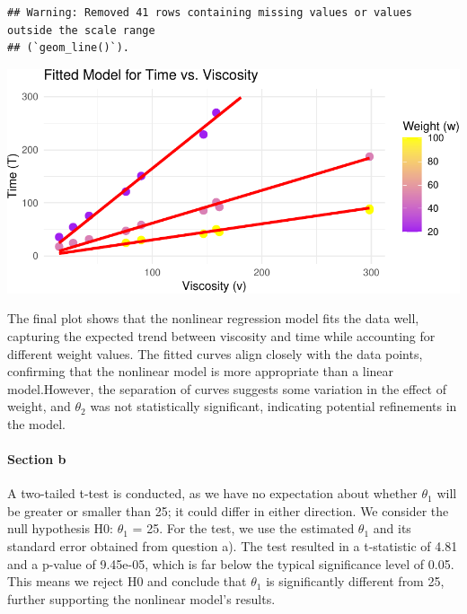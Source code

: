 \documentclass[
  11pt,
]{article}
\begin{document}
\begin{verbatim}
## Warning: Removed 41 rows containing missing values or values outside the scale range
## (`geom_line()`).
\end{verbatim}

\includegraphics{ReportAssignment2_files/figure-latex/unnamed-chunk-23-1.pdf}

The final plot shows that the nonlinear regression model fits the data
well, capturing the expected trend between viscosity and time while
accounting for different weight values. The fitted curves align closely
with the data points, confirming that the nonlinear model is more
appropriate than a linear model.However, the separation of curves
suggests some variation in the effect of weight, and \(\theta_2\) was
not statistically significant, indicating potential refinements in the
model.

\paragraph{Section b}\label{section-b-2}

A two-tailed t-test is conducted, as we have no expectation about
whether \(\theta_1\) will be greater or smaller than 25; it could differ
in either direction. We consider the null hypothesis H0: \(\theta_1\) =
25. For the test, we use the estimated \(\theta_1\) and its standard
error obtained from question a). The test resulted in a t-statistic of
4.81 and a p-value of 9.45e-05, which is far below the typical
significance level of 0.05. This means we reject H0 and conclude that
\(\theta_1\) is significantly different from 25, further supporting the
nonlinear model's results.
\end{document}
